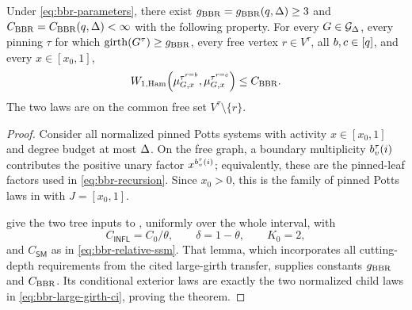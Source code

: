 \begin{theorem}
\label{thm:bbr-large-girth-ci}
Under \eqref{eq:bbr-parameters}, there exist
\(g_{\rm BBR}=g_{\rm BBR}(q,\Deg)\ge3\) and
\(C_{\rm BBR}=C_{\rm BBR}(q,\Deg)<\infty\) with the following property.
For every \(G\in\Gdeg\), every pinning \(\tau\) for which
\(\operatorname{girth}(G^\tau)\ge g_{\rm BBR}\), every free vertex
\(r\in V^\tau\), all \(b,c\in\colours\), and every \(x\in[x_0,1]\),
\begin{equation}
 \WHam\!\left(
   \mupin{G}{\tau^{r=b}}{x},
   \mupin{G}{\tau^{r=c}}{x}
 \right)\le C_{\rm BBR}.
 \label{eq:bbr-large-girth-ci}
\end{equation}
The two laws are on the common free set \(V^\tau\setminus\{r\}\).
\end{theorem}

\begin{proof}
Consider all normalized pinned Potts systems with
activity \(x\in[x_0,1]\) and degree budget at most \(\Deg\).  On the free
graph, a boundary multiplicity \(\bcount_v^\tau(i)\) contributes the
positive unary factor \(x^{\bcount_v^\tau(i)}\); equivalently, these are
the pinned-leaf factors used in \eqref{eq:bbr-recursion}.  Since \(x_0>0\), this is the family of pinned Potts laws in
 with \(J=[x_0,1]\).

 give the two tree inputs to
, uniformly over the whole interval, with
\[
 C_{\mathsf{INFL}}=C_0/\theta,\qquad
 \delta=1-\theta,\qquad K_0=2,
\]
and \(C_{\mathsf{SM}}\) as in \eqref{eq:bbr-relative-ssm}.  That lemma,
which incorporates all cutting-depth requirements from the cited
large-girth transfer, supplies constants
\(g_{\rm BBR}\) and \(C_{\rm BBR}\).  Its conditional exterior laws are
exactly the two normalized child laws in
\eqref{eq:bbr-large-girth-ci}, proving the theorem.
\end{proof}
